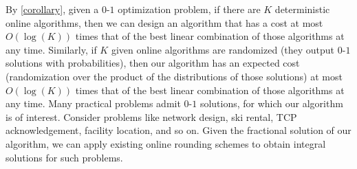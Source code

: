 By \cref{corollary}, given a $0$-$1$ optimization problem, if there are $K$ deterministic online algorithms, then
we can design an algorithm that has a cost at most $O(\log (K))$ times that of the best linear combination of those algorithms at any time.
Similarly, if $K$ given online algorithms are randomized (they output $0$-$1$ solutions with probabilities), then our algorithm
has an expected cost (randomization over the product of the distributions of those solutions) at most $O(\log(K))$ times that of
the best linear combination of those algorithms at any time. Many practical problems admit $0$-$1$ solutions, for which our algorithm is of interest.
Consider problems like network design, ski rental, TCP acknowledgement, facility location, and so on. Given the fractional solution of our algorithm,
we can apply existing online rounding schemes to obtain integral solutions for such problems.
